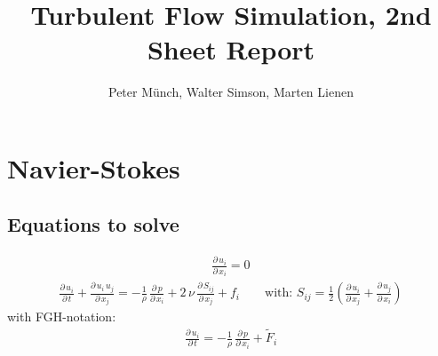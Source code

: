 \documentclass[11pt,a4paper]{article}
\title{Turbulent Flow Simulation, 2nd Sheet Report}
\author{Peter Münch, Walter Simson, Marten Lienen}
\begin{document}
\newcommand{\abl}[2]{\frac{\partial \, #1}{\partial \, #2}}
\newcommand{\abll}[2]{\frac{\partial^2 \, #1}{\partial \, #2^2}}
\newcommand{\ave}[1]{\left\langle#1\right\rangle}
\newcommand{\new}[1]{\textcolor{red}{#1}}

\maketitle

\section{Navier-Stokes}
\subsection{Equations to solve}
\begin{align}
\abl{u_i}{x_i}=0
\end{align}
\begin{align}
\abl{u_i	}{t}+\abl{u_i\,u_j}{x_j}=-\frac{1}{\rho}\,\abl{p}{x_i}+2\,\nu\,\abl{S_{ij}}{x_j}+f_i \qquad
\text{with: }S_{ij}=\frac{1}{2}\left(\abl{u_i}{x_j}+\abl{u_j}{x_i}\right)
\end{align}
with FGH-notation:
\begin{align}
\abl{u_i	}{t}=-\frac{1}{\rho}\,\abl{p}{x_i}+\tilde F_i
\end{align}
\end{document}
